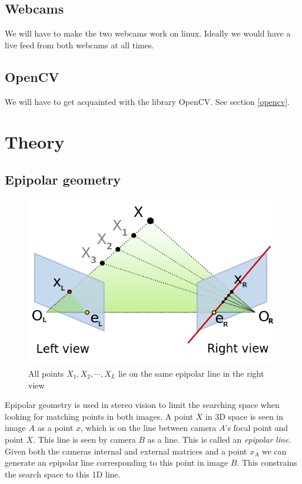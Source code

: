 \documentclass[a4paper]{article}
\begin{document}
\subsection{Webcams} 
We will have to make the two webcams work on linux. Ideally we would
have a live feed from both webcams at all times.

\subsection{OpenCV} 
We will have to get acquainted with the library OpenCV. See section
\ref{opencv}.

\section{Theory}

\subsection{Epipolar geometry}
\label{epipolar}

\begin{figure}[h!]
  \centering
  \includegraphics[width=1.0\textwidth]{Epipolar_geometry}
  \caption{All points $X_{1}, X_{2}, \cdots, X_{L}$ lie on the same
epipolar line in the right view}
  \label{fig:epipole}
\end{figure}

Epipolar geometry is used in stereo vision to limit the searching
space when looking for matching points in both images. A point $X$ in
3D space is seen in image $A$ as a point $x$, which is on the line
between camera $A$'s focal point and point $X$. This line is seen by
camera $B$ as a line. This is called an \emph{epipolar line}. Given
both the cameras internal and external matrices and a point $x_A$ we
can generate an epipolar line corresponding to this point in image
$B$. This constrains the search space to this 1D line.
\end{document}
